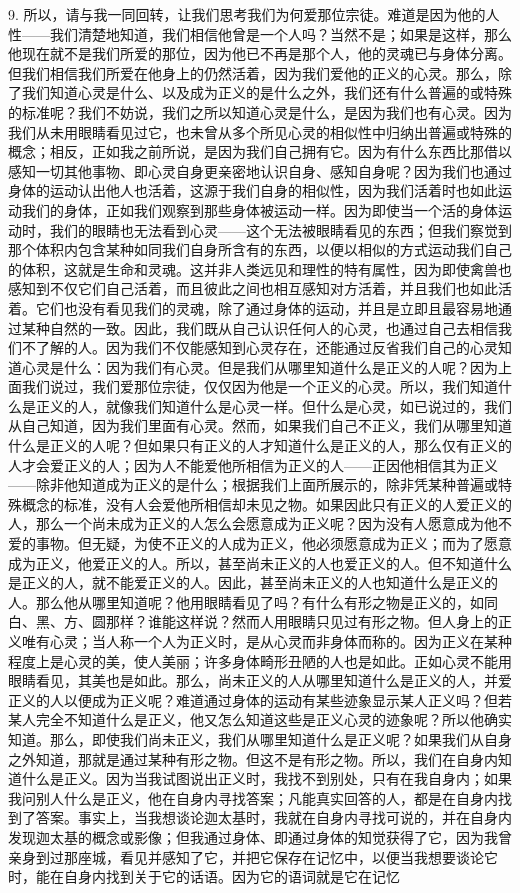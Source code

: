 9. 所以，请与我一同回转，让我们思考我们为何爱那位宗徒。难道是因为他的人性——我们清楚地知道，我们相信他曾是一个人吗？当然不是；如果是这样，那么他现在就不是我们所爱的那位，因为他已不再是那个人，他的灵魂已与身体分离。但我们相信我们所爱在他身上的仍然活着，因为我们爱他的正义的心灵。那么，除了我们知道心灵是什么、以及成为正义的是什么之外，我们还有什么普遍的或特殊的标准呢？我们不妨说，我们之所以知道心灵是什么，是因为我们也有心灵。因为我们从未用眼睛看见过它，也未曾从多个所见心灵的相似性中归纳出普遍或特殊的概念；相反，正如我之前所说，是因为我们自己拥有它。因为有什么东西比那借以感知一切其他事物、即心灵自身更亲密地认识自身、感知自身呢？因为我们也通过身体的运动认出他人也活着，这源于我们自身的相似性，因为我们活着时也如此运动我们的身体，正如我们观察到那些身体被运动一样。因为即使当一个活的身体运动时，我们的眼睛也无法看到心灵——这个无法被眼睛看见的东西；但我们察觉到那个体积内包含某种如同我们自身所含有的东西，以便以相似的方式运动我们自己的体积，这就是生命和灵魂。这并非人类远见和理性的特有属性，因为即使禽兽也感知到不仅它们自己活着，而且彼此之间也相互感知对方活着，并且我们也如此活着。它们也没有看见我们的灵魂，除了通过身体的运动，并且是立即且最容易地通过某种自然的一致。因此，我们既从自己认识任何人的心灵，也通过自己去相信我们不了解的人。因为我们不仅能感知到心灵存在，还能通过反省我们自己的心灵知道心灵是什么：因为我们有心灵。但是我们从哪里知道什么是正义的人呢？因为上面我们说过，我们爱那位宗徒，仅仅因为他是一个正义的心灵。所以，我们知道什么是正义的人，就像我们知道什么是心灵一样。但什么是心灵，如已说过的，我们从自己知道，因为我们里面有心灵。然而，如果我们自己不正义，我们从哪里知道什么是正义的人呢？但如果只有正义的人才知道什么是正义的人，那么仅有正义的人才会爱正义的人；因为人不能爱他所相信为正义的人——正因他相信其为正义——除非他知道成为正义的是什么；根据我们上面所展示的，除非凭某种普遍或特殊概念的标准，没有人会爱他所相信却未见之物。如果因此只有正义的人爱正义的人，那么一个尚未成为正义的人怎么会愿意成为正义呢？因为没有人愿意成为他不爱的事物。但无疑，为使不正义的人成为正义，他必须愿意成为正义；而为了愿意成为正义，他爱正义的人。所以，甚至尚未正义的人也爱正义的人。但不知道什么是正义的人，就不能爱正义的人。因此，甚至尚未正义的人也知道什么是正义的人。那么他从哪里知道呢？他用眼睛看见了吗？有什么有形之物是正义的，如同白、黑、方、圆那样？谁能这样说？然而人用眼睛只见过有形之物。但人身上的正义唯有心灵；当人称一个人为正义时，是从心灵而非身体而称的。因为正义在某种程度上是心灵的美，使人美丽；许多身体畸形丑陋的人也是如此。正如心灵不能用眼睛看见，其美也是如此。那么，尚未正义的人从哪里知道什么是正义的人，并爱正义的人以便成为正义呢？难道通过身体的运动有某些迹象显示某人正义吗？但若某人完全不知道什么是正义，他又怎么知道这些是正义心灵的迹象呢？所以他确实知道。那么，即使我们尚未正义，我们从哪里知道什么是正义呢？如果我们从自身之外知道，那就是通过某种有形之物。但这不是有形之物。所以，我们在自身内知道什么是正义。因为当我试图说出正义时，我找不到别处，只有在我自身内；如果我问别人什么是正义，他在自身内寻找答案；凡能真实回答的人，都是在自身内找到了答案。事实上，当我想谈论迦太基时，我就在自身内寻找可说的，并在自身内发现迦太基的概念或影像；但我通过身体、即通过身体的知觉获得了它，因为我曾亲身到过那座城，看见并感知了它，并把它保存在记忆中，以便当我想要谈论它时，能在自身内找到关于它的话语。因为它的语词就是它在记忆